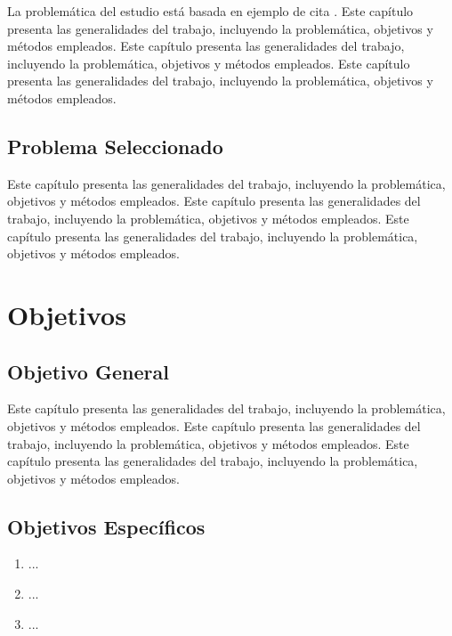 La problemática del estudio está basada en ejemplo de cita \parencite{petticrew_roberts_2006}. 
Este capítulo presenta las generalidades del trabajo, incluyendo la problemática, objetivos y métodos empleados. Este capítulo presenta las generalidades del trabajo, incluyendo la problemática, objetivos y métodos empleados. Este capítulo presenta las generalidades del trabajo, incluyendo la problemática, objetivos y métodos empleados.

\subsection{Problema Seleccionado}
Este capítulo presenta las generalidades del trabajo, incluyendo la problemática, objetivos y métodos empleados. Este capítulo presenta las generalidades del trabajo, incluyendo la problemática, objetivos y métodos empleados. Este capítulo presenta las generalidades del trabajo, incluyendo la problemática, objetivos y métodos empleados.

\section{Objetivos}

\subsection{Objetivo General}
Este capítulo presenta las generalidades del trabajo, incluyendo la problemática, objetivos y métodos empleados. Este capítulo presenta las generalidades del trabajo, incluyendo la problemática, objetivos y métodos empleados. Este capítulo presenta las generalidades del trabajo, incluyendo la problemática, objetivos y métodos empleados.


\subsection{Objetivos Específicos}
\begin{enumerate}[label=O\arabic*.] %
    \item ... %
    \item ... %
    \item ... %
\end{enumerate}

